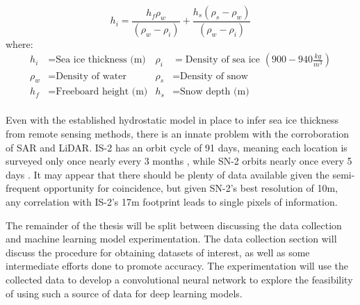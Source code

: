 \begin{equation}
	\label{eq:isostatic-equilibrium}
	\displaystyle h_i=\frac{\displaystyle h_f\rho_w}{(\rho_w-\rho_i)}+\frac{\displaystyle h_s(\rho_s-\rho_w)}{(\rho_w-\rho_i)}
\end{equation}
where:
\begin{align*}
 \displaystyle h_i    &=  \text{Sea ice thickness (m)} &  \rho_i 							&=  \text{Density of sea ice }(900-940 \frac{kg}{m^3}) \\   %
 \rho_w 							&=  \text{Density of water} 		 & 	\rho_s							&=  \text{Density of snow} \\   %
 \displaystyle h_f    &=  \text{Freeboard height (m)}  & 	\displaystyle h_s   &=  \text{Snow depth (m)} \\   %
\end{align*}

Even with the established hydrostatic model in place to infer sea ice thickness from remote sensing methods, there is an innate problem with the corroboration of SAR and LiDAR. IS-2 has an orbit cycle of 91 days, meaning each location is surveyed only once nearly every 3 months \cite{ICESat-2-ATL10-Product}, while SN-2 orbits nearly once every 5 days \cite{copernicusSentinel2Missions}. It may appear that there should be plenty of data available given the semi-frequent opportunity for coincidence, but given SN-2's best resolution of 10m, any correlation with IS-2's 17m footprint leads to single pixels of information.


The remainder of the thesis will be split between discussing the data collection and machine learning model experimentation. The data collection section will discuss the procedure for obtaining datasets of interest, as well as some intermediate efforts done to promote accuracy. The  experimentation will use the collected data to develop a convolutional neural network to explore the feasibility of using such a source of data for deep learning models.